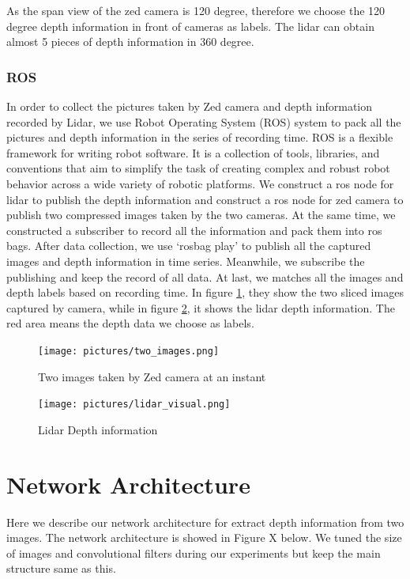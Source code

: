 \documentclass[10pt,twocolumn,letterpaper]{article}
\begin{document}
As the span view of the zed camera is 120 degree, therefore we choose the 120 degree depth information in front of cameras as labels. The lidar can obtain almost 5 pieces of depth information in 360 degree. 
\subsubsection{ROS}
In order to collect the pictures taken by Zed camera and depth information recorded by Lidar, we use Robot Operating System (ROS) system to pack all the pictures and depth information in the series of recording time. ROS is a flexible framework for writing robot software. It is a collection of tools, libraries, and conventions that aim to simplify the task of creating complex and robust robot behavior across a wide variety of robotic platforms\cite{ROSabout}. We construct a ros node for lidar to publish the depth information and construct a ros node for zed camera to publish two compressed images taken by the two cameras. At the same time, we constructed a subscriber to record all the information and pack them into ros bags. After data collection, we use ‘rosbag play’ to publish all the captured images and depth information in time series. Meanwhile, we subscribe the publishing and keep the record of all data. At last, we matches all the images and depth labels based on recording time.  In figure \ref{two_images}, they show the two sliced images captured by camera, while in figure \ref{lidar_visual}, it shows the lidar depth information. The red area means the depth data we choose as labels.
\begin{figure}[t]
\begin{center}
\texttt{[image: pictures/two\_images.png]}
\end{center}
   \caption{Two images taken by Zed camera at an instant}
\label{two_images}
\end{figure}

\begin{figure}[t]
	\begin{center}
		\texttt{[image: pictures/lidar\_visual.png]}
	\end{center}
	\caption{Lidar Depth information}
	\label{lidar_visual}
\end{figure}

\section{Network Architecture}
Here we describe our network architecture for extract depth information from two images. The network architecture is showed in Figure X below. We tuned the size of images and convolutional filters during our experiments but keep the main structure same as this.
\end{document}
